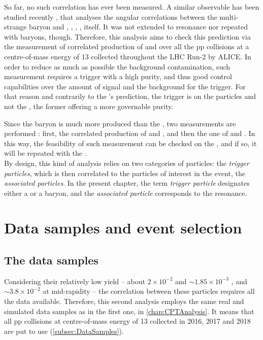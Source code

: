 So far, no such correlation has ever been measured. A similar observable has been studied recently \cite{adolfssonStudyXiHadron2020}, that analyses the angular correlations between the multi-strange baryon \rmXiPM and \pOrPbar, \rmPiPM, \rmKPM, \rmLambdaPM, \rmXiPM itself. It was not extended to \rmPhiMes resonance nor repeated with \rmOmega baryons, though. Therefore, this analysis aims to check this prediction via the measurement of correlated production of \rmOmega and \rmPhiMes over all the pp collisions at a centre-of-mass energy of 13 \tev collected throughout the LHC Run-2 by ALICE. In order to reduce as much as possible the background contamination, such measurement requires a trigger with a high purity, and thus good control capabilities over the amount of signal and the background for the trigger. For that reason and contrarily to the \Pythia's prediction, the trigger is on the \rmOmega particles and not the \rmPhiMes, the former offering a more governable purity.

Since the \rmXi baryon is much more produced than the \rmOmega, two measurements are performed : first, the correlated production of \rmXi and \rmPhiMes, and then the one of \rmOmega and \rmPhiMes. In this way, the feasibility of such measurement can be checked on the \rmXi, and if so, it will be repeated with the \rmOmega.\\

By design, this kind of analysis relies on two categories of particles: the \textit{trigger particles}, which is then correlated to the particles of interest in the event, the \textit{associated particles}. In the present chapter, the term \textit{trigger particle} designates either a \rmXi or a \rmOmega baryon, and the \textit{associated particle} corresponds to the \rmPhiMes resonance.


\section{Data samples and event selection}

\subsection{The data samples}

Considering their relatively low yield -- about $ 2 \times 10^{-2}$ \rmXi and $\sim 1.85 \times 10^{-3}$ \rmOmega, and $\sim 3.8 \times 10^{-2}$ \rmPhiMes at mid-rapidity \cite{alicecollaborationProductionLightflavorHadrons2020} -- the correlation between these particles requires all the data available. Therefore, this second analysis employs the same real and simulated data samples as in the first one, in \chap\ref{chap:CPTAnalysis}. It means that all pp collisions at centre-of-mass energy of 13 \tev collected in 2016, 2017 and 2018 are put to use (\Sec\ref{subsec:DataSamples}). 

